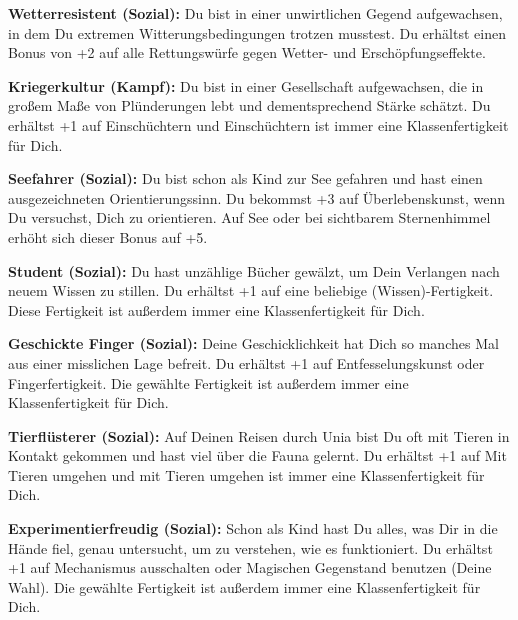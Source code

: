 \documentclass[
	ngerman,
	a4paper,
	11pt,
	twocolumn,
]{scrartcl}
\begin{document}
\textbf{Wetterresistent (Sozial):} Du bist in einer unwirtlichen Gegend aufgewachsen, in dem Du extremen Witterungsbedingungen trotzen musstest. Du erhältst einen Bonus von +2 auf alle Rettungswürfe gegen Wetter- und Erschöpfungseffekte.

\textbf{Kriegerkultur (Kampf):} Du bist in einer Gesellschaft aufgewachsen, die in großem Maße von Plünderungen lebt und dementsprechend Stärke schätzt. Du erhältst +1 auf Einschüchtern und Einschüchtern ist immer eine Klassenfertigkeit für Dich.

\textbf{Seefahrer (Sozial):} Du bist schon als Kind zur See gefahren und hast einen ausgezeichneten Orientierungssinn. Du bekommst +3 auf Überlebenskunst, wenn Du versuchst, Dich zu orientieren. Auf See oder bei sichtbarem Sternenhimmel erhöht sich dieser Bonus auf +5.

\textbf{Student (Sozial):} Du hast unzählige Bücher gewälzt, um Dein Verlangen nach neuem Wissen zu stillen. Du erhältst +1 auf eine beliebige (Wissen)-Fertigkeit. Diese Fertigkeit ist außerdem immer eine Klassenfertigkeit für Dich.

\textbf{Geschickte Finger (Sozial):} Deine Geschicklichkeit hat Dich so manches Mal aus einer misslichen Lage befreit. Du erhältst +1 auf Entfesselungskunst oder Fingerfertigkeit. Die gewählte Fertigkeit ist außerdem immer eine Klassenfertigkeit für Dich.

\textbf{Tierflüsterer (Sozial):} Auf Deinen Reisen durch Unia bist Du oft mit Tieren in Kontakt gekommen und hast viel über die Fauna gelernt. Du erhältst +1 auf Mit Tieren umgehen und mit Tieren umgehen ist immer eine Klassenfertigkeit für Dich.

\textbf{Experimentierfreudig (Sozial):} Schon als Kind hast Du alles, was Dir in die Hände fiel, genau untersucht, um zu verstehen, wie es funktioniert. Du erhältst +1 auf Mechanismus ausschalten oder Magischen Gegenstand benutzen (Deine Wahl). Die gewählte Fertigkeit ist außerdem immer eine Klassenfertigkeit für Dich.
\end{document}

